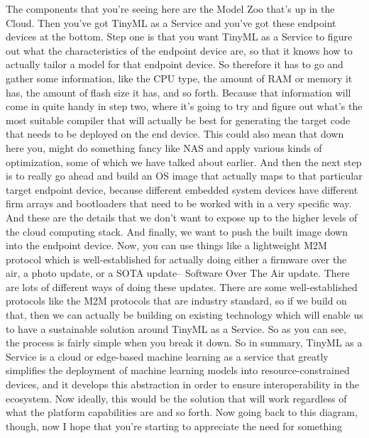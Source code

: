 {{{{{    The components that you're seeing here are
    the Model Zoo that's up in the Cloud.
    Then you've got TinyML as a Service and you've got these endpoint devices
    at the bottom.
    Step one is that you want TinyML as a Service
    to figure out what the characteristics of the endpoint device are,
    so that it knows how to actually tailor a model for that endpoint device.
    So therefore it has to go and gather some information,
    like the CPU type, the amount of RAM or memory it has, the amount of flash
    size it has, and so forth.
    Because that information will come in quite handy in step two, where
    it's going to try and figure out what's the most suitable compiler that
    will actually be best for generating the target code
    that needs to be deployed on the end device.
    This could also mean that down here you, might do something fancy like NAS
    and apply various kinds of optimization, some of which
    we have talked about earlier.
    And then the next step is to really go ahead and build an OS image
    that actually maps to that particular target endpoint device,
    because different embedded system devices have different firm arrays
    and bootloaders that need to be worked with in a very specific way.
    And these are the details that we don't want
    to expose up to the higher levels of the cloud computing stack.
    And finally, we want to push the built image down into the endpoint device.
    Now, you can use things like a lightweight M2M protocol which is
    well-established for actually doing either a firmware over the air,
    a photo update, or a SOTA update--
    Software Over The Air update.
    There are lots of different ways of doing these updates.
    There are some well-established protocols like the M2M protocols
    that are industry standard, so if we build on that,
    then we can actually be building on existing technology
    which will enable us to have a sustainable solution around TinyML
    as a Service.
    So as you can see, the process is fairly simple when you break it down.
    So in summary, TinyML as a Service is a cloud or edge-based machine
    learning as a service that greatly simplifies the deployment of machine
    learning models into resource-constrained devices,
    and it develops this abstraction in order to ensure interoperability
    in the ecosystem.
    Now ideally, this would be the solution that
    will work regardless of what the platform capabilities are and so forth.
    Now going back to this diagram, though, now I
    hope that you're starting to appreciate the need for something
}}}}}
